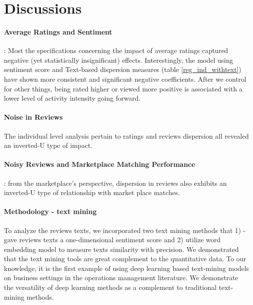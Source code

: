 \documentclass[msom,blindrev]{informs3}
\begin{document}
%






\section{Discussions}

\paragraph{Average Ratings and Sentiment} : Most the specifications concerning the impact of average ratings captured negative (yet statistically insignificant) effects.  Interestingly, the model using sentiment score and Text-based dispersion measures (table \ref{reg_ind_withtext}) have shown more consistent and significant negative coefficients. After we control for other things, being rated higher or viewed more positive is associated with a lower level of activity intensity going forward. \\

\paragraph{Noise in Reviews} The individual level analysis pertain to ratings and reviews dispersion all revealed an inverted-U type of impact.

\paragraph{Noisy Reviews and Marketplace Matching Performance}: from the marketplace's perspective, dispersion in reviews also exhibits an inverted-U type of relationship with market place matches.

\paragraph{Methodology - text mining} To analyze the reviews texts, we incorporated two text mining methods that 1) - gave reviews texts a one-dimensional sentiment score and 2) utilize word embedding model to measure texts similarity with precision. We demonstrated that the text mining tools are great complement to the quantitative data. To our knowledge, it is the first example of using deep learning based text-mining models on business settings in the operations management literature. We demonstrate the versatility of deep learning methods as a complement to traditional text-mining methods.
\end{document}
